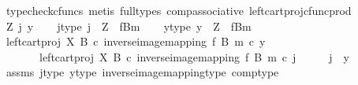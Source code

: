 \begin{isabellebody}
\ {\isacharparenleft}{\kern0pt}typecheck{\isacharunderscore}{\kern0pt}cfuncs{\isacharcomma}{\kern0pt}\ metis\ {\isacharparenleft}{\kern0pt}full{\isacharunderscore}{\kern0pt}types{\isacharparenright}{\kern0pt}\ comp{\isacharunderscore}{\kern0pt}associative{}\ left{\isacharunderscore}{\kern0pt}cart{\isacharunderscore}{\kern0pt}proj{\isacharunderscore}{\kern0pt}cfunc{\isacharunderscore}{\kern0pt}prod{\isacharparenright}{\kern0pt}\isanewline
\ \ \isamarkupfalse%
\isanewline
{}\isamarkupfalse%
\isanewline
\ \ \isamarkupfalse%
\ Z\ j\ y\isanewline
\ \ \isamarkupfalse%
\ j{\isacharunderscore}{\kern0pt}type{\isacharcolon}{\kern0pt}\ {\isachardoublequoteopen}j\ {\isacharcolon}{\kern0pt}\ Z\ {\isasymrightarrow}\ {\isacharparenleft}{\kern0pt}f\isactrlsup {\isacharminus}{\kern0pt}B{\isasymrparr}\isactrlbsub m\isactrlesub {\isacharparenright}{\kern0pt}{\isachardoublequoteclose}\isanewline
\ \ \isamarkupfalse%
\ y{\isacharunderscore}{\kern0pt}type{\isacharcolon}{\kern0pt}\ {\isachardoublequoteopen}y\ {\isacharcolon}{\kern0pt}\ Z\ {\isasymrightarrow}\ {\isacharparenleft}{\kern0pt}f\isactrlsup {\isacharminus}{\kern0pt}B{\isasymrparr}\isactrlbsub m\isactrlesub {\isacharparenright}{\kern0pt}{\isachardoublequoteclose}\isanewline
\ \ \isamarkupfalse%
\ {\isachardoublequoteopen}{\isacharparenleft}{\kern0pt}left{\isacharunderscore}{\kern0pt}cart{\isacharunderscore}{\kern0pt}proj\ X\ B\ {\isasymcirc}\isactrlsub c\ inverse{\isacharunderscore}{\kern0pt}image{\isacharunderscore}{\kern0pt}mapping\ f\ B\ m{\isacharparenright}{\kern0pt}\ {\isasymcirc}\isactrlsub c\ y\ {\isacharequal}{\kern0pt}\isanewline
\ \ \ \ \ \ \ {\isacharparenleft}{\kern0pt}left{\isacharunderscore}{\kern0pt}cart{\isacharunderscore}{\kern0pt}proj\ X\ B\ {\isasymcirc}\isactrlsub c\ inverse{\isacharunderscore}{\kern0pt}image{\isacharunderscore}{\kern0pt}mapping\ f\ B\ m{\isacharparenright}{\kern0pt}\ {\isasymcirc}\isactrlsub c\ j{\isachardoublequoteclose}\isanewline
\ \ \isamarkupfalse%
\ \isamarkupfalse%
\ {\isachardoublequoteopen}j\ {\isacharequal}{\kern0pt}\ y{\isachardoublequoteclose}\isanewline
\ \ \ \ \isamarkupfalse%
\ assms\ j{\isacharunderscore}{\kern0pt}type\ y{\isacharunderscore}{\kern0pt}type\ inverse{\isacharunderscore}{\kern0pt}image{\isacharunderscore}{\kern0pt}mapping{\isacharunderscore}{\kern0pt}type\ comp{\isacharunderscore}{\kern0pt}type\isanewline
\ \ \ \ \isamarkupfalse%

\end{isabellebody}
